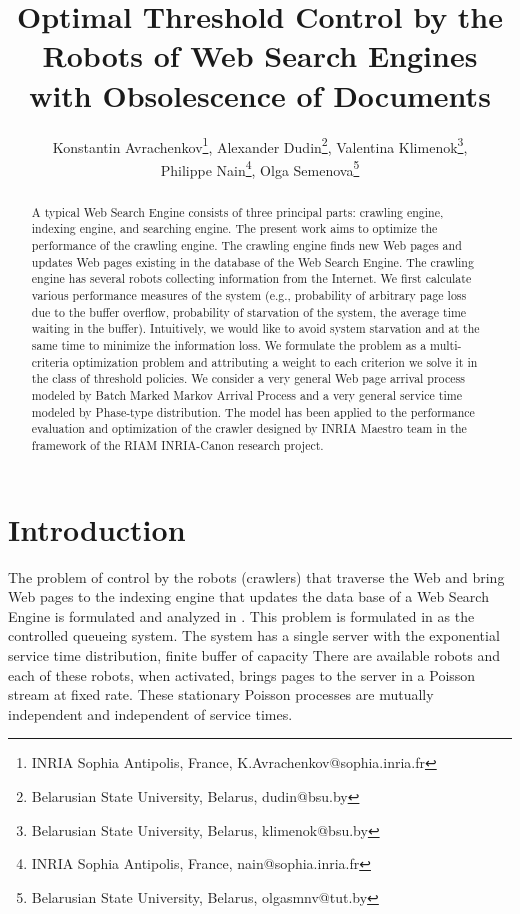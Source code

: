 \documentclass[11pt]{article}
\begin{document}
\title{Optimal Threshold Control by the Robots of Web Search Engines with Obsolescence of Documents}

\author{Konstantin Avrachenkov\thanks{INRIA Sophia Antipolis, France, K.Avrachenkov@sophia.inria.fr},
Alexander Dudin\thanks{Belarusian State University, Belarus, dudin@bsu.by},
Valentina Klimenok\thanks{Belarusian State University, Belarus, klimenok@bsu.by},\\
Philippe Nain\thanks{INRIA Sophia Antipolis, France, nain@sophia.inria.fr},
Olga Semenova\thanks{Belarusian State University, Belarus, olgasmnv@tut.by}
}


\date{}

\maketitle

\begin{abstract}
A typical Web Search Engine consists of three principal parts: crawling engine,
indexing engine, and searching engine. The present work aims to optimize the
performance of the crawling engine. The crawling engine finds new Web pages and
updates Web pages existing in the database of the Web Search Engine. The crawling
engine has several robots collecting information from the Internet. We first
calculate various performance measures of the system (e.g., probability of
arbitrary page loss due to the buffer overflow, probability of starvation of
the system, the average time waiting in the buffer). Intuitively, we would like
to avoid system starvation and at the same time to minimize the information loss.
We formulate the problem as a multi-criteria optimization problem and attributing
a weight to each criterion we solve it in the class of threshold policies.
We consider a very general Web page arrival process modeled by Batch Marked
Markov Arrival Process and a very general service time modeled by Phase-type
distribution. The model has been applied to the performance evaluation and
optimization of the crawler designed by INRIA Maestro team in the framework
of the RIAM INRIA-Canon research project.
\end{abstract}






\section{Introduction}
The problem of control by the robots (crawlers) that traverse the Web
and bring Web pages to the indexing engine that updates the data
base of a Web Search Engine is formulated and analyzed in
\cite{tlnc}. This problem is formulated in \cite{tlnc} as the
controlled queueing system. The system has a single server with the
exponential service time distribution, finite buffer of capacity
 There are  available robots and each of these
robots, when activated, brings pages to the server in a Poisson
stream at fixed rate.  These  stationary Poisson processes are
mutually independent and independent of service times.
\end{document}
